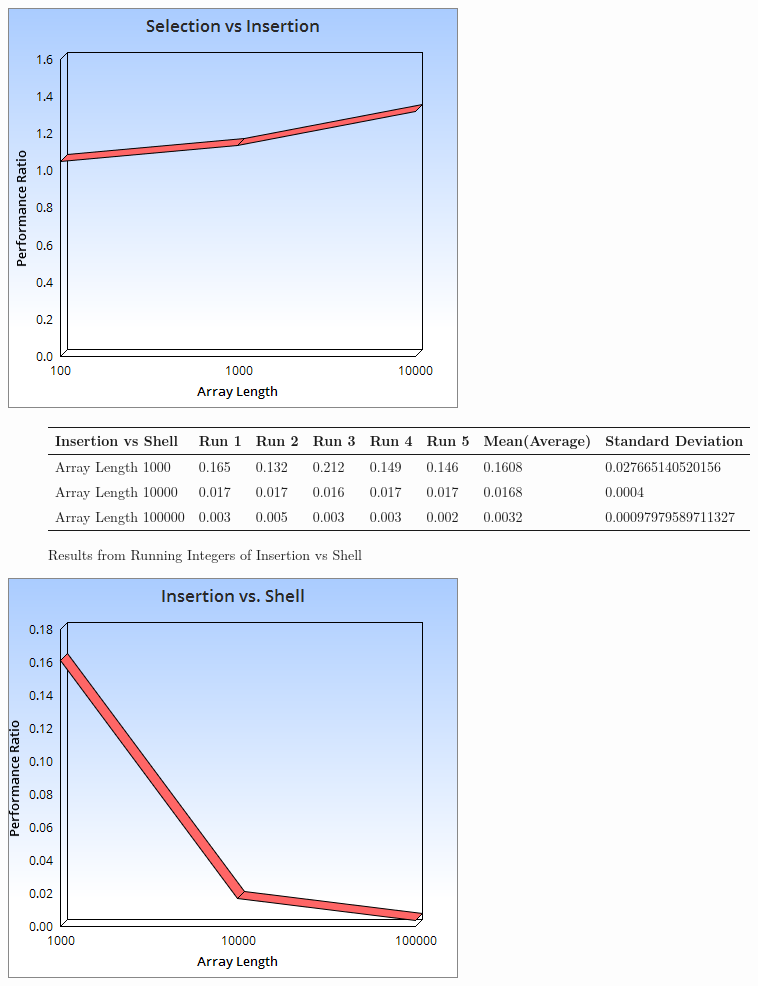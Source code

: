 \documentclass{article}
\begin{document}
\includegraphics[scale=0.5]{Integer1.png}
\begin{figure}[H]
\centering
\begin{adjustwidth}{-3.4cm}{}
\begin{tabular}{| l | l | l | l | l | l | l | l |}
\hline
Insertion vs Shell & Run 1 & Run 2 & Run 3 & Run 4 & Run 5 & Mean(Average) & Standard Deviation\\ \hline
Array Length 1000 & 0.165 & 0.132 & 0.212 & 0.149 & 0.146 & 0.1608  &  0.027665140520156 \\ \hline
Array Length 10000 & 0.017 & 0.017 & 0.016 & 0.017 & 0.017 & 0.0168 & 0.0004  \\ \hline
Array Length 100000 & 0.003 & 0.005 & 0.003 & 0.003 & 0.002  & 0.0032 & 0.00097979589711327 \\ \hline
\end{tabular}
\caption{Results from Running  Integers of Insertion vs Shell}
\end{adjustwidth}
\end{figure}
\includegraphics[scale=0.5]{Integer2.png}
\end{document}
